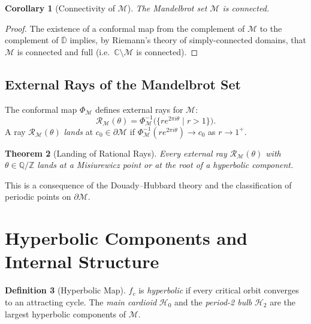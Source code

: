 \documentclass[12pt,a4paper]{amsart}
\newtheorem{theorem}{Theorem}[section]
\newtheorem{corollary}[theorem]{Corollary}
\theoremstyle{definition}
\newtheorem{definition}[theorem]{Definition}
\theoremstyle{remark}
\begin{document}
\begin{corollary}[Connectivity of $\mathcal{M}$]
The Mandelbrot set $\mathcal{M}$ is connected.
\end{corollary}

\begin{proof}
The existence of a conformal map from the complement of $\mathcal{M}$ to
the complement of $\overline{\mathbb{D}}$ implies, by Riemann's theory
of simply-connected domains, that $\mathcal{M}$ is connected and
full (i.e.\ $\mathbb{C} \setminus \mathcal{M}$ is connected).
\end{proof}

\subsection{External Rays of the Mandelbrot Set}

The conformal map $\Phi_{\mathcal{M}}$ defines external rays for $\mathcal{M}$:
\[
    \mathcal{R}_{\mathcal{M}}(\theta) = \Phi_{\mathcal{M}}^{-1}\bigl(\{ r e^{2\pi i \theta} \mid r > 1 \}\bigr).
\]
A ray $\mathcal{R}_{\mathcal{M}}(\theta)$ \emph{lands} at $c_0 \in \partial \mathcal{M}$
if $\Phi_{\mathcal{M}}^{-1}(r e^{2\pi i\theta}) \to c_0$ as $r \to 1^+$.

\begin{theorem}[Landing of Rational Rays]
Every external ray $\mathcal{R}_{\mathcal{M}}(\theta)$ with $\theta \in \mathbb{Q}/\mathbb{Z}$
lands at a Misiurewicz point or at the root of a hyperbolic component.
\end{theorem}

This is a consequence of the Douady--Hubbard theory and the classification
of periodic points on $\partial\mathcal{M}$.

\section{Hyperbolic Components and Internal Structure}

\begin{definition}[Hyperbolic Map]
$f_c$ is \emph{hyperbolic} if every critical orbit converges to an
attracting cycle. The \emph{main cardioid} $\mathcal{H}_0$ and the
\emph{period-2 bulb} $\mathcal{H}_2$ are the largest hyperbolic
components of $\mathcal{M}$.
\end{definition}
\end{document}
